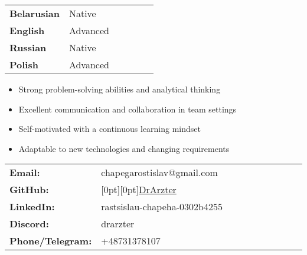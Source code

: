 \documentclass[10pt,a4paper,ragged2e,withhyper]{altacv}
\begin{document}
\begin{paracol}{2}
\begin{rightcolumn}
\divider

\begin{tabular}{p{0.4\linewidth} p{0.6\linewidth}}
\textbf{Belarusian} & Native \\
\textbf{English} & Advanced \\
\textbf{Russian} & Native \\
\textbf{Polish} & Advanced
\end{tabular}

\divider

\begin{itemize}
\item Strong problem-solving abilities and analytical thinking
\item Excellent communication and collaboration in team settings
\item Self-motivated with a continuous learning mindset
\item Adaptable to new technologies and changing requirements
\end{itemize}

\divider

\begin{tabular}{p{0.3\linewidth} >{\raggedright\arraybackslash}p{0.7\linewidth}}
\textbf{Email:}\hspace{0.5cm} & chapegarostislav@gmail.com \\
\textbf{GitHub:}\hspace{0.5cm} & \raisebox{0pt}[0pt][0pt]{\href{https://github.com/DrArzter}{DrArzter}} \\
\textbf{LinkedIn:}\hspace{0.5cm} & rastsislau-chapeha-0302b4255 \\
\textbf{Discord:}\hspace{0.5cm} & drarzter \\
\textbf{Phone/Telegram:}\hspace{0.5cm} & +48731378107
\end{tabular}

\end{rightcolumn}
\end{paracol}
\end{document}
